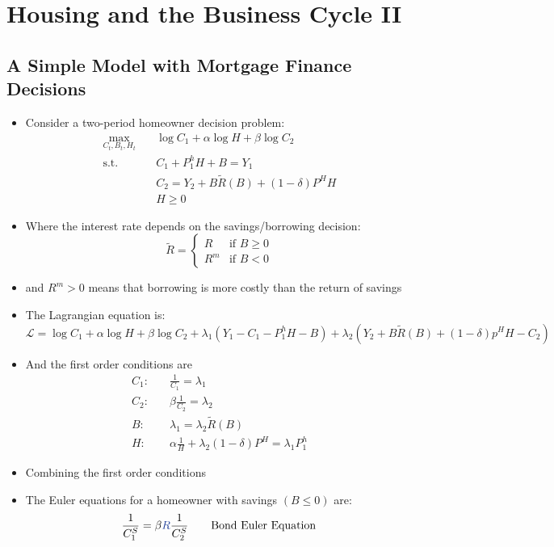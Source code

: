 \documentclass[a4paper,twoside]{article}
\numberwithin{equation}{section}
\numberwithin{figure}{section}
\begin{document}
\section{Housing and the Business Cycle II}
\subsection{A Simple Model with Mortgage Finance Decisions}
	\begin{itemize}
		\item Consider a two-period homeowner decision problem:
		\begin{align*}
			\max_{C_t,B_t,H_t}\quad &\log C_1 + \alpha\log H + \beta\log C_2 \\
			\text{s.t.}\quad &C_1 + P_1^h H + B = Y_1\\
			&C_2 = Y_2 + B\tilde{R}(B) + (1-\delta) P^H H\\
			&H \geq 0
		\end{align*}
		\item Where the interest rate depends on the savings/borrowing decision:
		\[
			\tilde{R}=
			\begin{cases}
				R &\text{if } B\geq0 \\
				R^m &\text{if } B<0
			\end{cases}
		\]
		\item and \( R^m > 0 \) means that borrowing is more costly than the return of savings
		\item The Lagrangian equation is:
		\[
			\mathcal{L} = \log C_1 + \alpha\log H + \beta\log C_2 + \lambda_1(Y_1 - C_1 - P_1^h H-B) + \lambda_2(Y_2 + B\tilde{R}(B) + (1-\delta)p^H H-C_2)
		\]
		\item And the first order conditions are
		\begin{align*}
			C_1:& \quad\frac{1}{C_1}=\lambda_1\\
			C_2:& \quad\beta\frac{1}{C_2}=\lambda_2\\
			B:& \quad\lambda_1=\lambda_2\tilde{R}(B)\\
			H:& \quad\alpha\frac{1}{H}+\lambda_2(1-\delta)P^H = \lambda_1P_1^h
		\end{align*}
		\item Combining the first order conditions
		\item The Euler equations for a homeowner with \textcolor{myblue}{savings} \( (B\leq0) \) are:
		\begin{alignat*}{2}
			\frac{1}{C_1^S} &= \beta\textcolor{myblue}{R}\frac{1}{C_2^S}\quad &&\text{Bond Euler Equation}\\

\end{alignat*}
\end{itemize}
\end{document}
